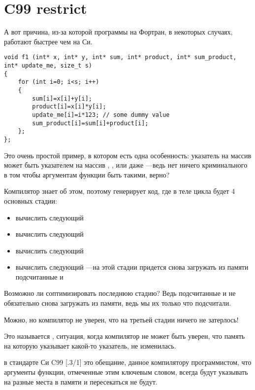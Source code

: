 \chapter{C99 restrict}

А вот причина, из-за которой программы на Фортран, в некоторых случаях, работают быстрее чем на Си.

\begin{lstlisting}
void f1 (int* x, int* y, int* sum, int* product, int* sum_product, int* update_me, size_t s)
{
	for (int i=0; i<s; i++)
	{
		sum[i]=x[i]+y[i];
		product[i]=x[i]*y[i];
		update_me[i]=i*123; // some dummy value
		sum_product[i]=sum[i]+product[i];	
	};
};
\end{lstlisting}

Это очень простой пример, в котором есть одна особенность: 
указатель на массив  может быть указателем на массив
, , или даже 
---ведь нет ничего криминального в том 
чтобы аргументам функции быть такими, верно?

Компилятор знает об этом, поэтому генерирует код, где в теле цикла будет 4 основных стадии:

\begin{itemize}
\item вычислить следующий 
\item вычислить следующий 
\item вычислить следующий 
\item вычислить следующий ---на этой стадии придется снова загружать из памяти подсчитанные
  и 
\end{itemize}

Возможно ли соптимизировать последнюю стадию?
Ведь подсчитанные  и  
не обязательно снова загружать из памяти, ведь мы их только что подсчитали.

Можно, но компилятор не уверен, что на третьей стадии ничего не затерлось!

Это называется
, ситуация, когда компилятор не может быть уверен, что память на которую указывает 
какой-то указатель, не изменилась.

 в стандарте Си C99 [.3/1]
это обещание, данное компилятору программистом, что аргументы функции, отмеченные этим ключевым словом,
всегда будут указывать на разные места в памяти и пересекаться не будут.

